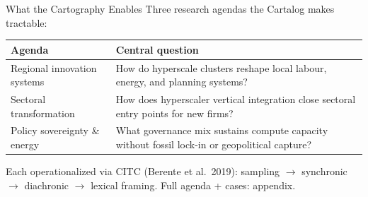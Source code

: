 \documentclass[aspectratio=169,11pt]{beamer}
\newcommand{\iconfull}[2]{\textcolor{#1}{\faIcon{#2}}}
\begin{document}
\begin{frame}{\iconfull{dcblue}{map}\enspace What the Cartography Enables}
\vspace{0.2em}
\footnotesize Three research agendas the Cartalog makes tractable:\\[0.5em]
\begin{tabularx}{\linewidth}{@{}p{3.2cm}X@{}}
\toprule
\textbf{Agenda} & \textbf{Central question} \\
\midrule
Regional innovation systems &
How do hyperscale clusters reshape local labour, energy, and planning systems? \\[0.3em]
Sectoral transformation &
How does hyperscaler vertical integration close sectoral entry points for new firms? \\[0.3em]
Policy sovereignty \& energy &
What governance mix sustains compute capacity without fossil lock-in or geopolitical capture? \\
\bottomrule
\end{tabularx}
\vspace{0.4em}
\footnotesize\textcolor{dcgray}{Each operationalized via CITC (Berente et al.\ 2019): sampling $\to$ synchronic $\to$ diachronic $\to$ lexical framing. Full agenda + cases: appendix.}
\end{frame}
\end{document}
